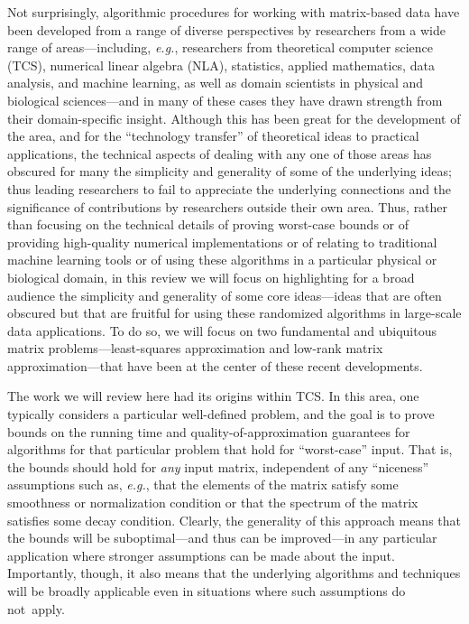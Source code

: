 \documentclass[twoside]{article}
\begin{document}
Not surprisingly, algorithmic procedures for working with matrix-based data 
have been developed from a range of diverse perspectives by researchers 
from a wide range of areas---including, \emph{e.g.}, researchers from 
theoretical computer science (TCS), numerical linear algebra (NLA), 
statistics, applied mathematics, data analysis, and machine learning, as 
well as domain scientists in physical and biological sciences---and in many 
of these cases they have drawn strength from their domain-specific insight.
Although this has been great for the development of the area, and for the 
``technology transfer'' of theoretical ideas to practical applications, the 
technical aspects of dealing with any one of those areas has obscured for many the 
simplicity and generality of some of the underlying ideas; thus leading 
researchers to fail to appreciate the underlying connections and the 
significance of contributions by researchers outside their own area. 
Thus, rather than focusing on the technical details of proving worst-case 
bounds or of providing high-quality numerical implementations or of relating 
to traditional machine learning tools or of using these algorithms in a 
particular physical or biological domain, in this review we will focus on 
highlighting for a broad audience the simplicity and generality of some core 
ideas---ideas that are often obscured but that are fruitful for using these 
randomized algorithms in large-scale data applications.
To do so, we will focus on two fundamental and ubiquitous matrix 
problems---least-squares approximation and low-rank matrix 
approximation---that have been at the center of these recent developments.


The work we will review here had its origins within TCS.
In this area, one typically considers a particular well-defined problem, and 
the goal is to prove bounds on the running time and quality-of-approximation 
guarantees for algorithms for that particular problem that hold for 
``worst-case'' input.
That is, the bounds should hold for \emph{any} input matrix, independent of 
any ``niceness'' assumptions such as, \emph{e.g.}, that the elements of the 
matrix satisfy some smoothness or normalization condition or that the 
spectrum of the matrix satisfies some decay condition.
Clearly, the generality of this approach means that the bounds will be 
suboptimal---and thus can be improved---in any particular application where 
stronger assumptions can be made about the input.
Importantly, though, it also means that the underlying algorithms and 
techniques will be broadly applicable even in situations where such 
assumptions do not~apply.
\end{document}
